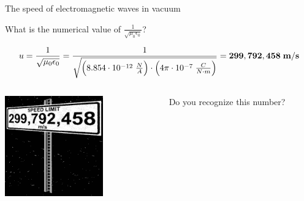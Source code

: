 %
%
%
%

\begin{frame}{The speed of electromagnetic waves in vacuum}

What is the numerical value of $\displaystyle \frac{1}{\sqrt{\mu_0 \epsilon_0}}$?

\begin{equation*}
    u =
      \frac{1}{\sqrt{\mu_0 \epsilon_0}} =
       \frac{1}{\sqrt{ \Big( 8.854 \cdot 10^{-12} \; \frac{N}{A} \Big) \cdot
                              \Big( 4\pi \cdot 10^{-7} \; \frac{C}{N\cdot m} \Big)
                            }
                   } =
       {\bf 299,792,458 \; m/s}
\end{equation*}

\vspace{0.2cm}

\begin{columns}
  \begin{column}{0.50\textwidth}
    \begin{center}
       \includegraphics[width=0.65\textwidth]{./images/misc/space_sign_speed_limit.png}\\
    \end{center}
  \end{column}
  \begin{column}{0.50\textwidth}
    \begin{center}
       Do you recognize this number?
    \end{center}
  \end{column}
\end{columns}

\end{frame}


%
%
%
%

